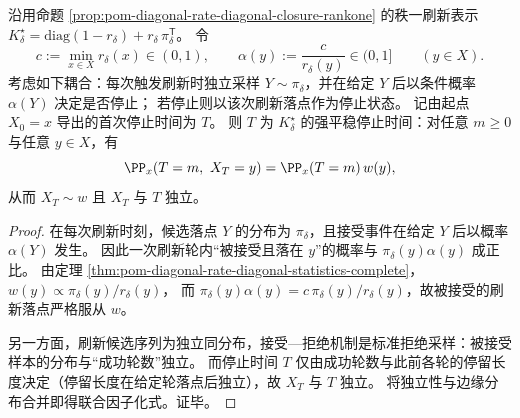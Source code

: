 \begin{theorem}[刷新接受强平稳停止时间]\label{thm:pom-diagonal-rate-refresh-accept-strong-stationary-time}
沿用命题 \ref{prop:pom-diagonal-rate-diagonal-closure-rankone} 的秩一刷新表示
\(
K^\star_\delta=\mathrm{diag}(1-r_\delta)+r_\delta\,\pi_\delta^{\mathsf T}
\)。
令
\[
c:=\min_{x\in X}r_\delta(x)\in(0,1),
\qquad
\alpha(y):=\frac{c}{r_\delta(y)}\in(0,1]\qquad(y\in X).
\]
考虑如下耦合：每次触发刷新时独立采样 \(Y\sim\pi_\delta\)，并在给定 \(Y\) 后以条件概率 \(\alpha(Y)\) 决定是否停止；
若停止则以该次刷新落点作为停止状态。
记由起点 \(X_0=x\) 导出的首次停止时间为 \(T\)。
则 \(T\) 为 \(K^\star_\delta\) 的强平稳停止时间：对任意 \(m\ge 0\) 与任意 \(y\in X\)，有
\[
\PP_x(T=m,\ X_T=y)=\PP_x(T=m)\,w(y),
\]
从而 \(X_T\sim w\) 且 \(X_T\) 与 \(T\) 独立。
\end{theorem}
\begin{proof}
在每次刷新时刻，候选落点 \(Y\) 的分布为 \(\pi_\delta\)，且接受事件在给定 \(Y\) 后以概率 \(\alpha(Y)\) 发生。
因此一次刷新轮内“被接受且落在 \(y\)”的概率与 \(\pi_\delta(y)\alpha(y)\) 成正比。
由定理 \ref{thm:pom-diagonal-rate-diagonal-statistics-complete}，
\(
w(y)\propto \pi_\delta(y)/r_\delta(y)
\)，
而 \(\pi_\delta(y)\alpha(y)=c\,\pi_\delta(y)/r_\delta(y)\)，故被接受的刷新落点严格服从 \(w\)。
\par
另一方面，刷新候选序列为独立同分布，接受—拒绝机制是标准拒绝采样：被接受样本的分布与“成功轮数”独立。
而停止时间 \(T\) 仅由成功轮数与此前各轮的停留长度决定（停留长度在给定轮落点后独立），故 \(X_T\) 与 \(T\) 独立。
将独立性与边缘分布合并即得联合因子化式。证毕。
\end{proof}


